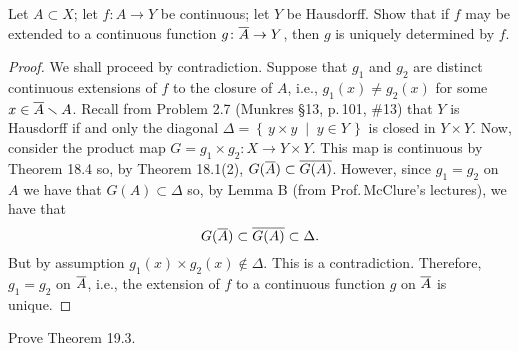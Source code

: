 \newpage
\begin{problem}[Munkres \S18, p.\,112, \#13]
Let $A\subset X$; let $f\colon A\to Y$ be continuous; let $Y$ be
Hausdorff. Show that if $f$ may be extended to a continuous
function $g\colon\overline{A}\to Y$, then $g$ is uniquely determined
by $f$.
\end{problem}
\begin{proof}
We shall proceed by contradiction. Suppose that $g_1$ and $g_2$
are distinct continuous extensions of $f$ to the closure of $A$,
i.e., $g_1(x)\neq g_2(x)$ for some $x\in\overline{A}\smallsetminus
A$. Recall from Problem 2.7 (Munkres \S13, p.\,101, \#13) that
$Y$ is Hausdorff if and only the diagonal
$\Delta=\left\{\,y\times y\;\middle|\;y\in Y\,\right\}$ is closed
in $Y\times Y$. Now, consider the product map $G=g_1\times
g_2\colon X\to Y\times Y$. This map is continuous by Theorem
18.4 so, by Theorem 18.1(2), $G(\overline{A})\subset\overline{G(A)}$. However, since $g_1=g_2$ on $A$ we have
that $G(A)\subset\Delta$ so, by Lemma B (from Prof.\,McClure's
lectures), we have that
\[
G(\overline{A})\subset\overline{G(A)}\subset\Delta.
\]
But by assumption $g_1(x)\times g_2(x)\notin\Delta$. This is a
contradiction. Therefore, $g_1=g_2$ on $\overline{A}$, i.e., the
extension of $f$ to a continuous function $g$ on $\overline{A}$ is
unique.
\end{proof}
\newpage
\begin{problem}[Munkres \S19, p.\,118, \#2]
Prove Theorem 19.3.
\end{problem}
